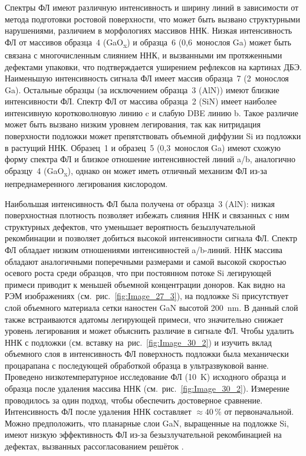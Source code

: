 Спектры ФЛ имеют различную интенсивность и ширину линий в зависимости от метода подготовки ростовой поверхности, что может быть вызвано структурными нарушениями, различием в морфологиях массивов ННК. Низкая интенсивность ФЛ от массивов образца~4 (GaO\textsubscript{x}) и образца~6 (0,6~монослоя Ga) может быть связана с многочисленным слиянием ННК, и вызванными им протяженными дефектами упаковки, что подтверждается уширением рефлексов на картинах ДБЭ. Наименьшую интенсивность сигнала ФЛ имеет массив образца~7 (2~монослоя Ga). Остальные образцы (за исключением образца~3 (AlN)) имеют близкие интенсивности ФЛ. Спектр ФЛ от массива образца~2 (SiN) имеет наиболее интенсивную коротковолновую линию c и слабую DBE линию b. Такое различие может быть вызвано низким уровнем легирования, так как нитридация поверхности подложки может препятствовать объемной диффузии Si из подложки в растущий ННК. Образец~1 и образец~5 (0,3~монослоя Ga) имеют схожую форму спектра ФЛ и близкое отношение интенсивностей линий a/b, аналогично образцу~4 (GaO\textsubscript{x}), однако он может иметь отличный механизм ФЛ из-за непреднамеренного легирования кислородом.

Наибольшая интенсивность ФЛ была получена от образца~3 (AlN): низкая поверхностная плотность позволяет избежать слияния ННК и связанных с ним структурных дефектов, что уменьшает вероятность безызлучательной рекомбинации и позволяет добиться высокой интенсивности сигнала ФЛ. Спектр ФЛ обладает низким отношениями интенсивностей a/b-линий. ННК массива обладают аналогичными поперечными размерами и самой высокой скоростью осевого роста среди образцов, что при постоянном потоке Si легирующей примеси приводит к меньшей объемной концентрации доноров. Как видно на РЭМ изображениях (см.~рис.~\cref{fig:Image_27_3}), на подложке Si присутствует слой объемного материала сетки наностен GaN высотой 200~\si{\nano\meter}. В данный слой также встраиваются адатомы легирующей примеси, что значительно снижает уровень легирования и может объяснить различие в сигнале ФЛ. Чтобы удалить ННК с подложки (см. вставку на~рис.~\cref{fig:Image_30_2}) и изучить вклад объемного слоя в интенсивность ФЛ поверхность подложки была механически процарапана с последующей обработкой образца в ультразвуковой ванне. Проведено низкотемпературное исследование ФЛ (10~\si{\kelvin}) исходного образца и образца после удаления массива ННК (см.~рис.~\cref{fig:Image_30_2}). Измерение проводилось за один подход, чтобы обеспечить достоверное сравнение. Интенсивность ФЛ после удаления ННК составляет \(\approx 40\,\%\) от первоначальной. Можно предположить, что планарные слои GaN, выращенные на подложке Si, имеют низкую эффективность ФЛ из-за безызлучательной рекомбинацией на дефектах, вызванных рассогласованием решёток \cite{Calleja1999, Reshchikov2005}.

